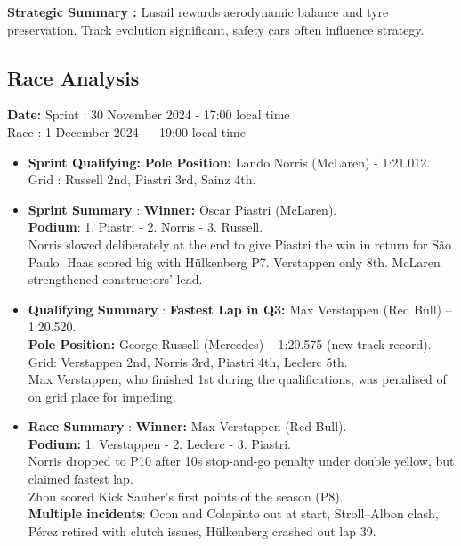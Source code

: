 \textbf{Strategic Summary :} Lusail rewards aerodynamic balance and tyre preservation. Track evolution significant, safety cars often influence strategy.

\subsection{Race Analysis}

\textbf{Date:} Sprint : 30 November 2024 - 17:00 local time\\
Race : 1 December 2024 — 19:00 local time 

\begin{itemize}
    \item \textbf{Sprint Qualifying:} \textbf{Pole Position:} Lando Norris (McLaren) - 1:21.012.\\
    Grid : Russell 2nd, Piastri 3rd, Sainz 4th.

    \item \textbf{Sprint Summary} : \textbf{Winner:} Oscar Piastri (McLaren). \\
    \textbf{Podium}: 1. Piastri - 2. Norris - 3. Russell. \\
    Norris slowed deliberately at the end to give Piastri the win in return for São Paulo. Haas scored big with Hülkenberg P7. Verstappen only 8th. McLaren strengthened constructors’ lead.

    \item \textbf{Qualifying Summary} : \textbf{Fastest Lap in Q3:} Max Verstappen (Red Bull) – 1:20.520. \\
    \textbf{Pole Position:} George Russell (Mercedes) – 1:20.575 (new track record). \\
    Grid: Verstappen 2nd, Norris 3rd, Piastri 4th, Leclerc 5th. \\
    Max Verstappen, who finished 1st during the qualifications, was penalised of on grid place for impeding.

    \item \textbf{Race Summary} : \textbf{Winner:} Max Verstappen (Red Bull). \\
    \textbf{Podium:} 1. Verstappen - 2. Leclerc - 3. Piastri. \\
    Norris dropped to P10 after 10s stop-and-go penalty under double yellow, but claimed fastest lap. \\
    Zhou scored Kick Sauber’s first points of the season (P8). \\
    \textbf{Multiple incidents}: Ocon and Colapinto out at start, Stroll–Albon clash, Pérez retired with clutch issues, Hülkenberg crashed out lap 39.


\end{itemize}
